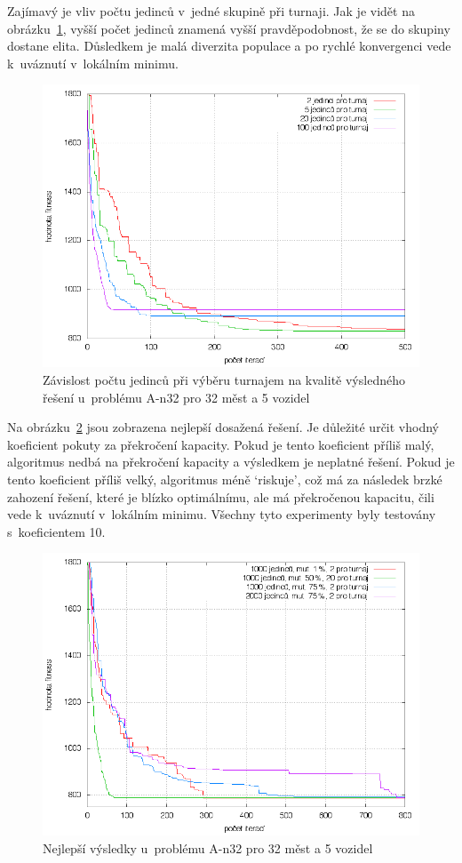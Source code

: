 \documentclass[a4paper]{article}
\begin{document}
Zajímavý je vliv počtu jedinců v~jedné skupině při turnaji. Jak je vidět na obrázku~\ref{fig:turnaj}, vyšší počet jedinců znamená vyšší pravděpodobnost, že se do skupiny dostane elita. Důsledkem je malá diverzita populace a po rychlé konvergenci vede k~uváznutí v~lokálním minimu.

\begin{figure}
\centering
\includegraphics[width=\textwidth]{turnaj.png}
\caption{Závislost počtu jedinců při výběru turnajem na kvalitě výsledného řešení u~problému A-n32 pro 32 měst a 5 vozidel\label{fig:turnaj}}
\end{figure}

Na obrázku~\ref{fig:best} jsou zobrazena nejlepší dosažená řešení. Je důležité určit vhodný koeficient pokuty za překročení kapacity. Pokud je tento koeficient příliš malý, algoritmus nedbá na překročení kapacity a výsledkem je neplatné řešení. Pokud je tento koeficient příliš velký, algoritmus méně `riskuje', což má za následek brzké zahození řešení, které je blízko optimálnímu, ale má překročenou kapacitu, čili vede k~uváznutí v~lokálním minimu. Všechny tyto experimenty byly testovány s~koeficientem 10.

\begin{figure}
\centering
\includegraphics[width=\textwidth]{best.png}
\caption{Nejlepší výsledky u~problému A-n32 pro 32 měst a 5 vozidel\label{fig:best}}
\end{figure}
\end{document}

